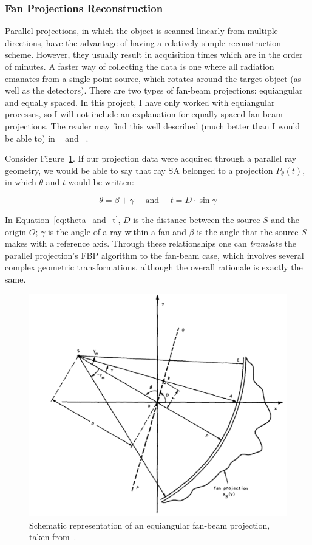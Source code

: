 \subsubsection{Fan Projections Reconstruction}%
\label{ssub:fan_projections_reconstruction}

Parallel projections, in which the object is scanned linearly from
multiple directions, have the advantage of having a relatively simple
reconstruction scheme. However, they usually result in acquisition times
which are in the order of minutes. A faster way of collecting the data
is one where all radiation emanates from a single point-source, which
rotates around the target object (as well as the detectors). There are
two types of fan-beam projections: equiangular and equally spaced. In
this project, I have only worked with equiangular processes, so I will
not include an explanation for equally spaced fan-beam projections. The
reader may find this well described (much better than I would be able
to) in ~\cite{Kak2001} and ~\cite{Herman1973}.

Consider Figure~\ref{fig:equiangular}. If our projection data were
acquired through a parallel ray geometry, we would be able to say that
ray SA belonged to a projection $P_{\theta}(t)$, in which $\theta$ and
$t$ would be written:

\begin{equation}
    \label{eq:theta_and_t}
    \theta = \beta + \gamma \quad \text{ and } \quad t = D \cdot \sin \gamma
\end{equation}

In Equation~\ref{eq:theta_and_t}, $D$ is the distance between the source
$S$ and the origin $O$; $\gamma$ is the angle of a ray within a fan and
$\beta$ is the angle that the source $S$ makes with a reference axis.
Through these relationships one can \emph{translate} the parallel
projection's FBP algorithm to the fan-beam case, which involves several
complex geometric transformations, although the overall rationale is
exactly the same.

\begin{figure}[htpb]
    \centering
    \includegraphics[width=.8\textwidth]{img/fig319.png}
    \caption{Schematic representation of an equiangular fan-beam
    projection, taken from~\cite{Kak2001}.}
    \label{fig:equiangular}
\end{figure}

